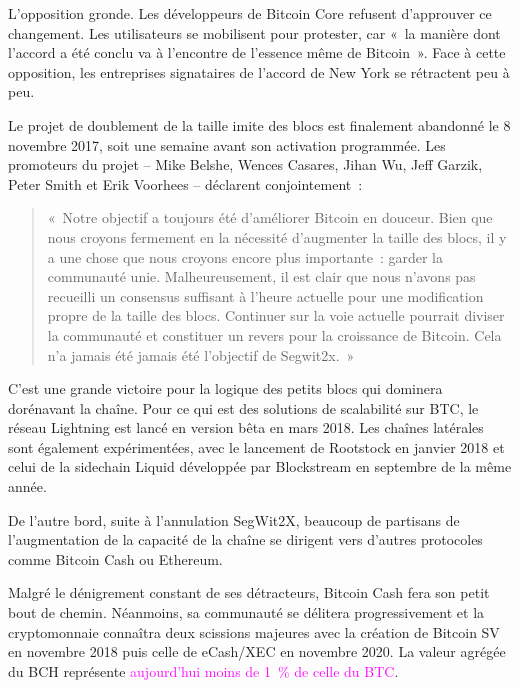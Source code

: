 L'opposition gronde. Les développeurs de Bitcoin Core refusent d'approuver ce changement. Les utilisateurs se mobilisent pour protester, car «~la manière dont l'accord a été conclu va à l'encontre de l'essence même de Bitcoin~». Face à cette opposition, les entreprises signataires de l'accord de New York se rétractent peu à peu. 

Le projet de doublement de la taille imite des blocs est finalement abandonné le 8 novembre 2017, soit une semaine avant son activation programmée. Les promoteurs du projet -- Mike Belshe, Wences Casares, Jihan Wu, Jeff Garzik, Peter Smith et Erik Voorhees -- déclarent conjointement~:

\begin{quote}
«~Notre objectif a toujours été d'améliorer Bitcoin en douceur. Bien que nous croyons fermement en la nécessité d'augmenter la taille des blocs, il y a une chose que nous croyons encore plus importante~: garder la communauté unie. Malheureusement, il est clair que nous n'avons pas recueilli un consensus suffisant à l'heure actuelle pour une modification propre de la taille des blocs. Continuer sur la voie actuelle pourrait diviser la communauté et constituer un revers pour la croissance de Bitcoin. Cela n'a jamais été jamais été l'objectif de Segwit2x.~»
\end{quote}

C'est une grande victoire pour la logique des petits blocs qui dominera dorénavant la chaîne. Pour ce qui est des solutions de scalabilité sur BTC, le réseau Lightning est lancé en version bêta en mars 2018. Les chaînes latérales sont également expérimentées, avec le lancement de Rootstock en janvier 2018 et celui de la sidechain Liquid développée par Blockstream en septembre de la même année.

De l'autre bord, suite à l'annulation SegWit2X, beaucoup de partisans de l'augmentation de la capacité de la chaîne se dirigent vers d'autres protocoles comme Bitcoin Cash ou Ethereum. 

Malgré le dénigrement constant de ses détracteurs, Bitcoin Cash fera son petit bout de chemin. Néanmoins, sa communauté se délitera progressivement et la cryptomonnaie connaîtra deux scissions majeures avec la création de Bitcoin SV en novembre 2018 puis celle de eCash/XEC en novembre 2020. La valeur agrégée du BCH représente \textcolor{magenta}{aujourd'hui moins de 1~\% de celle du BTC}.

